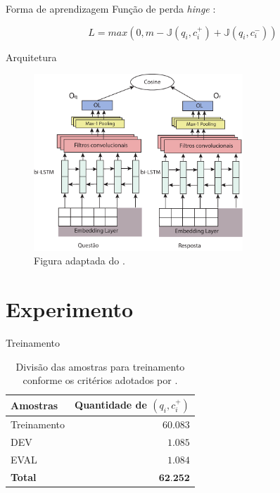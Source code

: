 \documentclass[10pt]{beamer}
\begin{document}
\begin{frame}{Forma de aprendizagem}
	Função de perda \textit{hinge} \cite{tan-lstm-qa, Gu-deep-code-search:2018}:
	
    \begin{equation}
    L = max(0, m - \mathbb{J}(q_{i}, c_{i}^{+}) + \mathbb{J}(q_{i}, c_{i}^{-}))   
    \end{equation}
\end{frame}





\begin{frame}{Arquitetura}
	\begin{figure}[h]
    \centering
    \includegraphics[width=0.7\textwidth]{ArquiteturaBiLSTM.pdf}
    \caption{Figura adaptada do \cite{tan-lstm-qa}.}
    \label{fig:arquitetura-bi-lstm}
\end{figure}
\end{frame}


\section{Experimento}

\begin{frame}[fragile]{Treinamento}
      \begin{table}[h]
\centering
\begin{tabular}{ p{3cm} r  }
 \hline
 \textbf{Amostras} & \textbf{Quantidade de $(q_{i}, c_{i}^{+})$}\\
 \hline
 Treinamento & $60.083$\\
 
 DEV & $1.085$ \\
 
 EVAL & $1.084$\\
 \hline
 \textbf{Total} & $\textbf{62.252}$\\
 \hline
\end{tabular}
\caption{Divisão das amostras para treinamento conforme os critérios adotados por \cite{iyer-etal-2016-summarizing}.}
\label{table:divisao-amostras}
\end{table}
\end{frame}
\end{document}
